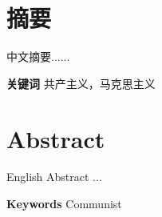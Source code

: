 \chapter*{摘要}
\thispagestyle{cAbstract}
中文摘要......

\vskip 0.5cm
\noindent{}\textbf{关键词}\quad{}
共产主义，马克思主义

\newpage
\chapter*{Abstract}
\thispagestyle{eAbstract}
English Abstract ...

\vskip 0.5cm
\noindent{}\textbf{Keywords}\quad{}
Communist

\newpage
\pagestyle{plain}